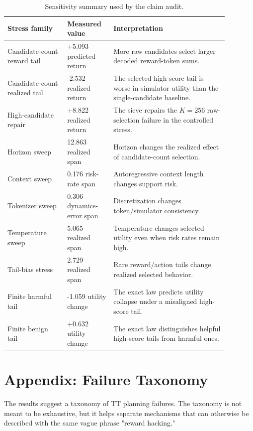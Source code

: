 \documentclass{article}
\begin{document}
\begin{table}[t]
\caption{Sensitivity summary used by the claim audit.}
\label{tab:sensitivity-summary}
\begin{center}
\small
\begin{tabular}{p{0.24\linewidth}p{0.18\linewidth}p{0.46\linewidth}}
\toprule
Stress family & Measured value & Interpretation \\
\midrule
Candidate-count reward tail & +5.093 predicted return & More raw candidates select larger decoded reward-token sums. \\
Candidate-count realized tail & -2.532 realized return & The selected high-score tail is worse in simulator utility than the single-candidate baseline. \\
High-candidate repair & +8.822 realized return & The sieve repairs the \(K=256\) raw-selection failure in the controlled stress. \\
Horizon sweep & 12.863 realized span & Horizon changes the realized effect of candidate-count selection. \\
Context sweep & 0.176 risk-rate span & Autoregressive context length changes support risk. \\
Tokenizer sweep & 0.306 dynamics-error span & Discretization changes token/simulator consistency. \\
Temperature sweep & 5.065 realized span & Temperature changes selected utility even when risk rates remain high. \\
Tail-bias stress & 2.729 realized span & Rare reward/action tails change realized selected behavior. \\
Finite harmful tail & -1.059 utility change & The exact law predicts utility collapse under a misaligned high-score tail. \\
Finite benign tail & +0.632 utility change & The exact law distinguishes helpful high-score tails from harmful ones. \\
\bottomrule
\end{tabular}
\end{center}
\end{table}

\section{Appendix: Failure Taxonomy}

The results suggest a taxonomy of TT planning failures. The taxonomy is not meant to be exhaustive, but it helps separate mechanisms that can otherwise be described with the same vague phrase "reward hacking."
\end{document}

